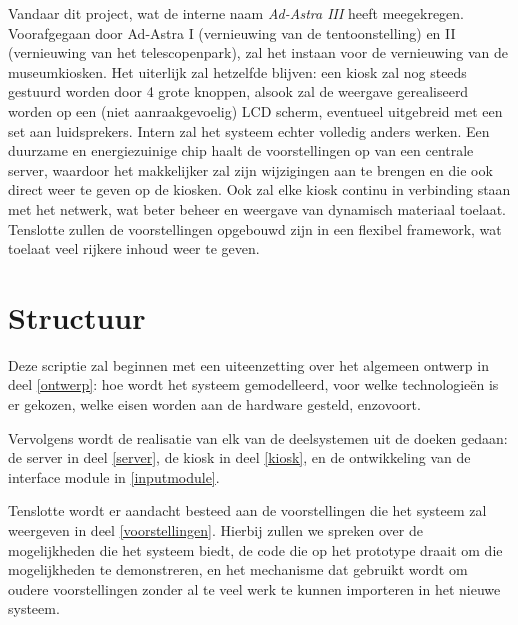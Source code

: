 Vandaar dit project, wat de interne naam \emph{Ad-Astra III} heeft meegekregen. Voorafgegaan door Ad-Astra I (vernieuwing van de tentoonstelling) en II (vernieuwing van het telescopenpark), zal het instaan voor de vernieuwing van de museumkiosken. Het uiterlijk zal hetzelfde blijven: een kiosk zal nog steeds gestuurd worden door 4 grote knoppen, alsook zal de weergave gerealiseerd worden op een (niet aanraakgevoelig) LCD scherm, eventueel uitgebreid met een set aan luidsprekers.
Intern zal het systeem echter volledig anders werken. Een duurzame en energiezuinige chip haalt de voorstellingen op van een centrale server, waardoor het makkelijker zal zijn wijzigingen aan te brengen en die ook direct weer te geven op de kiosken. Ook zal elke kiosk continu in verbinding staan met het netwerk, wat beter beheer en weergave van dynamisch materiaal toelaat. Tenslotte zullen de voorstellingen opgebouwd zijn in een flexibel framework, wat toelaat veel rijkere inhoud weer te geven.


%
%

\chapter{Structuur}
\label{chat:structuur}

Deze scriptie zal beginnen met een uiteenzetting over het algemeen ontwerp in deel \ref{ontwerp}: hoe wordt het systeem gemodelleerd, voor welke technologieën is er gekozen, welke eisen worden aan de hardware gesteld, enzovoort.

Vervolgens wordt de realisatie van elk van de deelsystemen uit de doeken gedaan: de server in deel \ref{server}, de kiosk in deel \ref{kiosk}, en de ontwikkeling van de interface module in \ref{inputmodule}.

Tenslotte wordt er aandacht besteed aan de voorstellingen die het systeem zal weergeven in deel \ref{voorstellingen}. Hierbij zullen we spreken over de mogelijkheden die het systeem biedt, de code die op het prototype draait om die mogelijkheden te demonstreren, en het mechanisme dat gebruikt wordt om oudere voorstellingen zonder al te veel werk te kunnen importeren in het nieuwe systeem.
